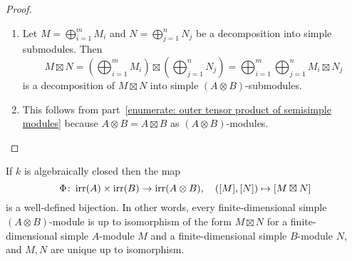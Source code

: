 \begin{proof}
  \leavevmode
  \begin{enumerate}
    \item
      Let $M = \bigoplus_{i=1}^m M_i$ and $N = \bigoplus_{j=1}^n N_j$ be a decomposition into simple submodules.
      Then
      \[
          M \mathbin{\boxtimes} N
        = \left( \bigoplus_{i=1}^m M_i \right) \mathbin{\boxtimes} \left( \bigoplus_{j=1}^n N_j \right)
        = \bigoplus_{i=1}^m \bigoplus_{j=1}^n M_i \mathbin{\boxtimes} N_j
      \]
      is a decomposition of $M \mathbin{\boxtimes} N$ into simple $(A \otimes B)$-submodules.
    \item
      This follows from part~\ref*{enumerate: outer tensor product of semisimple modules} because $A \otimes B = A \mathbin{\boxtimes} B$ as $(A \otimes B)$-modules.
    \qedhere
  \end{enumerate}
\end{proof}




\begin{theorem}
  \label{theorem: simple modules over tensor products}
  If $k$ is algebraically closed then the map
  \[
            \Phi
    \colon  \operatorname{irr}(A) \times \operatorname{irr}(B)
    \to     \operatorname{irr}(A \otimes B),
    \quad   ([M],[N])
    \mapsto [M \mathbin{\boxtimes} N]
  \]
  is a well-defined bijection.
  In other words, every finite-dimensional simple $(A \otimes B)$-module is up to isomorphism of the form $M \mathbin{\boxtimes} N$ for a finite-dimensional simple $A$-module $M$ and a finite-dimensional simple $B$-module $N$, and $M, N$ are unique up to isomorphism.
\end{theorem}


